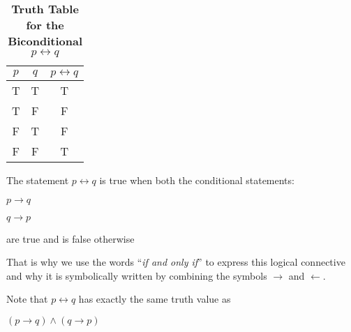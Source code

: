 \begin{table}[h!]
\centering
\caption*{\textbf{Truth Table for the Biconditional $p \leftrightarrow q$}}
\begin{tabular}{|c|c!{\vrule width 1.5pt}c|}
\hline
{}
\textbf{$p$} & \textbf{$q$} & \textbf{$p \leftrightarrow q$} \\
\hline
T & T & T \\
T & F & F \\
F & T & F \\
F & F & T \\
\hline
\end{tabular}
\end{table}
\begin{tcolorbox}[colback=white, colframe=gray!60, title=Remark 1]
The statement $p \leftrightarrow q$ is true when both the conditional statements:
\begin{center}
$p \rightarrow q$    
\end{center}
\begin{center}
$q \rightarrow p$    
\end{center}
are true and is false otherwise
\end{tcolorbox}
\begin{tcolorbox}[colback=white, colframe=gray!60, title=Remark 2]
That is why we use the words “\textit{if and only if}” to express this logical connective and why it is symbolically written by
combining the symbols $\rightarrow$ and $\leftarrow$.
\end{tcolorbox}
\begin{tcolorbox}[colback=white, colframe=gray!60, title=Remark 3]
Note that $p\leftrightarrow q$ has exactly the same truth value as 
\begin{center}
$(p\rightarrow q) \land (q \rightarrow p)$    
\end{center}{}
\end{tcolorbox}

